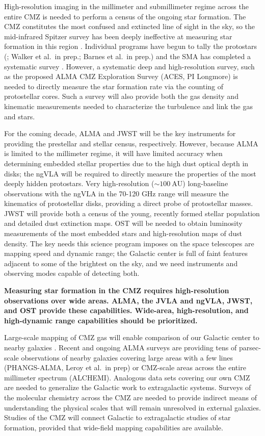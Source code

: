 \documentclass[modern]{aastex62}
\begin{document}
High-resolution imaging in the millimeter and submillimeter regime across the
entire CMZ is needed to perform a census of the ongoing star formation.  The
CMZ constitutes the most confused and extincted line of sight in the sky, so
the mid-infrared Spitzer survey has been deeply ineffective at measuring star
formation in this region \citep{Koepferl2015a}. Individual programs have
begun to tally the protostars (\citealt{Ginsburg2018a,Lu2019a}; Walker et al.\ in prep.; Barnes et al.\ in
prep.) and the SMA has completed a systematic
survey \citep{Battersby2017b}. However, a systematic deep and high-resolution
survey, such as the proposed ALMA CMZ Exploration Survey (ACES, PI Longmore) is
needed to directly measure the star formation rate via the counting of
protostellar cores. Such a survey will also provide both the gas density and
kinematic measurements needed to characterize the turbulence and link the gas and
stars.



For the coming decade, ALMA and JWST will be the key instruments for providing
the prestellar and stellar census, respectively.  However, because ALMA is limited to the millimeter regime,
it will have limited accuracy when determining embedded stellar properties due to the high dust optical depth in disks; the ngVLA will be required to directly measure
the properties of the most deeply hidden protostars.  Very high-resolution ($\sim100\mathrm{~AU}$)
long-baseline observations with the ngVLA in the 70-120 GHz range will measure
the kinematics of protostellar disks, providing a direct probe of protostellar
masses.  JWST will provide both
a census of the young, recently formed stellar population and detailed dust 
extinction maps.  OST will be needed to obtain luminosity measurements of the
most embedded stars and high-resolution maps of dust density.  The key needs
this science program imposes on the space telescopes are mapping speed
and dynamic range; the Galactic center is full of faint features adjacent
to some of the brightest on the sky, and we need instruments and observing
modes capable of detecting both.

\textbf{Measuring star formation in the CMZ requires high-resolution
observations over wide areas.  ALMA, the JVLA and ngVLA, JWST, and OST provide
these capabilities.  Wide-area, high-resolution, and high-dynamic range capabilities should be 
prioritized.
}

Large-scale mapping of CMZ gas will enable comparison of our Galactic center to
nearby galaxies \citep[e.g.,][]{Leroy2018a}.
Recent and ongoing ALMA
surveys are providing tens of parsec-scale observations of nearby galaxies
covering large areas with a few lines (PHANGS-ALMA, Leroy et al.\ in prep) or
CMZ-scale areas across the entire millimeter spectrum (ALCHEMI).  Analogous
data sets covering our own CMZ are needed to generalize the Galactic work to extragalactic systems.  Surveys of the molecular
chemistry across the CMZ are needed to provide indirect means of understanding
the physical scales that will remain unresolved in external galaxies.
Studies of the CMZ will connect Galactic to extragalactic studies of star
formation, provided that wide-field mapping capabilities are available.

\pagebreak

\end{document}
